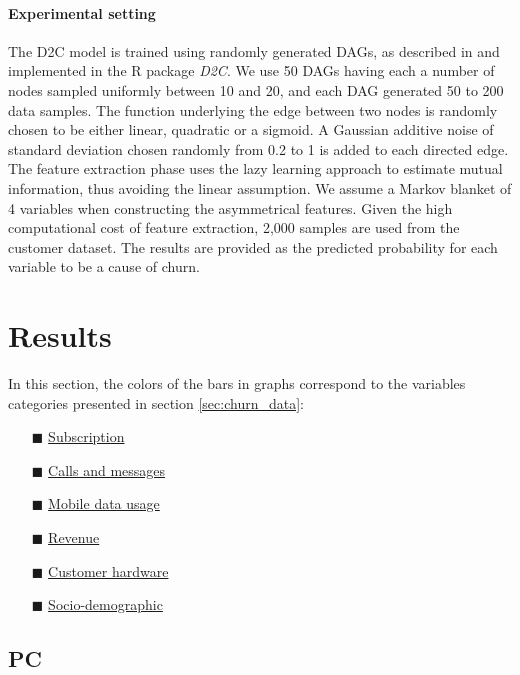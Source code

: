 \paragraph{Experimental setting}  The D2C model is trained using randomly
generated DAGs, as described in \parencite{bontempi2015dependency} and
implemented in the R package \emph{D2C}. We use 50 DAGs having each a number of
nodes sampled uniformly between 10 and 20, and each DAG generated 50 to 200 data
samples. The function underlying the edge between two nodes is randomly chosen
to be either linear, quadratic or a sigmoid. A Gaussian additive noise of
standard deviation chosen randomly from 0.2 to 1 is added to each directed edge.
The feature extraction phase uses the lazy learning approach
\parencite{bontempi1999lazy} to estimate mutual information, thus avoiding the
linear assumption. We assume a Markov blanket of 4 variables when constructing
the asymmetrical features. Given the high computational cost of feature
extraction, 2,000 samples are used from the customer dataset. The results are
provided as the predicted probability for each variable to be a cause of churn.

\section{Results}

In this section, the colors of the bars in graphs correspond to the
variables categories presented in section \ref{sec:churn_data}:

\begin{itemize}
    \item[\color{themeyellow}$\blacksquare$] \ul{Subscription}
    \item[\color{themeblue}$\blacksquare$] \ul{Calls and messages}
    \item[\color{darkerblue}$\blacksquare$] \ul{Mobile data usage}
    \item[\color{themepurple}$\blacksquare$] \ul{Revenue}
    \item[\color{darkerorange}$\blacksquare$] \ul{Customer hardware}
    \item[\color{themeorange}$\blacksquare$] \ul{Socio-demographic}
\end{itemize}

\subsection{PC}

